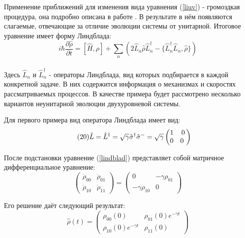 Применение приближений для изменения вида уравнения ({\ref{liuv}}) - громоздкая процедура, она подробно описана в работе \cite{Vool2017}. В результате в нём появляются слагаемые, отвечающие за отличие эволюции системы от унитарной. Итоговое уравнение имеет форму Линдблада:
\begin{equation}
\tag{19}
\label{lindblad}
i\hbar \frac{\partial\hat\rho}{\partial t} = [\hat H,\rho] + \sum_n (2\hat L_a \hat \rho \hat L^\dagger_n - \{\hat L^\dagger_n\hat L_n,\hat \rho\})
\end{equation} 
\\

Здесь $\hat L_n$ и $\hat L^\dagger_n$ - операторы Линдблада, вид которых подбирается в каждой конкретной задаче. В них содержится информация о механизмах и скоростях рассматриваемых процессов. В качестве примера будет рассмотрено несколько вариантов неунитарной эволюции двухуровневой системы. 

Для первого примера вид оператора Линдблада имеет вид:
\begin{equation}
\tag{20}
\label{dephaseop}
\hat L = \hat L^\dagger = \sqrt{\gamma}\hat \sigma^\dagger\hat \sigma^-  = \sqrt{\gamma}\begin{pmatrix}
1&0\\0&0\
\end{pmatrix}
\\
\end{equation}

После подстановки уравнение (\ref{lindblad}) представляет собой матричное дифференциальное уравнение:
\begin{equation}
\tag{21}
\begin{pmatrix}
\dot\rho_{00} & \dot\rho_{01}\\\dot\rho_{10}&\dot\rho_{11}
\end{pmatrix} = \begin{pmatrix}
0&-\gamma\rho_{01}\\-\gamma\rho_{10}&0
\end{pmatrix}
\end{equation}

Его решение даёт следующий результат:
\begin{equation}
\tag{22}
\hat\rho(t) = \begin{pmatrix}
\rho_{00}(0)&\rho_{01}(0)e^{-\gamma t}\\ \rho_{10}(0)e^{-\gamma t}&\rho_{11}(0)
\end{pmatrix}
\end{equation}

